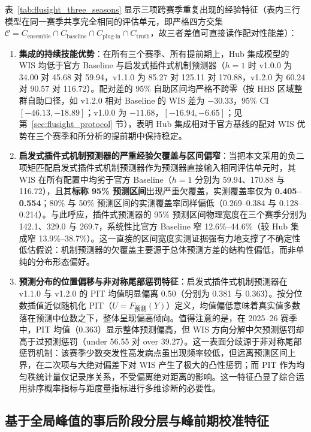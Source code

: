 \documentclass[11pt,a4paper]{article}
\theoremstyle{plain}
\theoremstyle{definition}
\begin{document}
表~\ref{tab:flusight_three_seasons} 显示三项跨赛季重复出现的经验特征（表内三行模型在同一赛季共享完全相同的评估单元，即严格四方交集 $\mathcal{C}=C_{\text{ensemble}} \cap C_{\text{baseline}} \cap C_{\text{plug-in}} \cap C_{\text{truth}}$，故三者差值可直接读作配对性能差）：
\begin{enumerate}[leftmargin=*,itemsep=0.2pt,topsep=1pt,parsep=0pt]
\item \textbf{集成的持续技能优势}：在所有三个赛季、所有提前期上，Hub 集成模型的 WIS 均低于官方 Baseline 与启发式插件式机制预测器（$h=1$ 时 v1.0.0 为 34.00 对 45.68 对 59.94，v1.1.0 为 85.27 对 125.11 对 170.88，v1.2.0 为 60.24 对 90.57 对 116.72）。配对差的 95\% 自助区间均严格不跨零（按 HHS 区域整群自助口径，如 v1.2.0 相对 Baseline 的 WIS 差为 $-30.33$，95\% CI $[-46.13, -18.89]$；v1.0.0 为 $-11.68$，$[-16.94, -6.65]$；见第~\ref{sec:flusight_protocol} 节），表明 Hub 集成相对于官方基线的配对 WIS 优势在三个赛季和所分析的提前期中保持稳定。
\item \textbf{启发式插件式机制预测器的严重经验欠覆盖与区间偏窄}：当把本文采用的负二项矩匹配启发式插件式机制预测器作为预测器直接输入相同评估单元时，其 WIS 在所有配置中均劣于官方 Baseline（$h=1$ 分别为 59.94、170.88 与 116.72），且其\textbf{标称 95\% 预测区间}出现严重欠覆盖，实测覆盖率仅为 \textbf{0.405--0.554}；80\% 与 50\% 预测区间的实测覆盖率同样偏低（0.269--0.384 与 0.128--0.214）。与此呼应，插件式预测器的 95\% 预测区间物理宽度在三个赛季分别为 142.1、329.0 与 269.7，系统性比官方 Baseline 窄 12.6\%--44.6\%（较 Hub 集成窄 13.9\%--38.7\%）。这一直接的区间宽度实测证据强有力地支撑了不确定性低估假说：机制预测器的欠覆盖主要源于总体预测方差的结构性偏低，而非单纯的分布形态偏好。
\item \textbf{预测分布的位置偏移与非对称尾部惩罚特征}：启发式插件式机制预测器在 v1.1.0 与 v1.2.0 的 PIT 均值明显偏离 0.50（分别为 0.381 与 0.363）。按分位数插值近似随机化 PIT（$U=F_{\text{预测}}(Y)$）定义，均值偏低意味着真实值多数落在预测中位数之下，整体呈现偏高倾向。值得注意的是，在 2025--26 赛季中，PIT 均值（0.363）显示整体预测偏高，但 WIS 方向分解中欠预测惩罚却高于过预测惩罚（under 56.55 对 over 39.27）。这一表面分歧源于非对称尾部惩罚机制：该赛季少数突发性高发病点虽出现频率较低，但远离预测区间上界，在二次项与大绝对偏差下对 WIS 产生了极大的凸性惩罚；而 PIT 作为均匀秩统计量仅记录序关系，不受偏离绝对距离的影响。这一特征凸显了综合运用排序概率指标与距度量指标进行多维诊断的必要性。
\end{enumerate}

\subsection{基于全局峰值的事后阶段分层与峰前期校准特征}\label{sec:phase_collapse}
\end{document}
